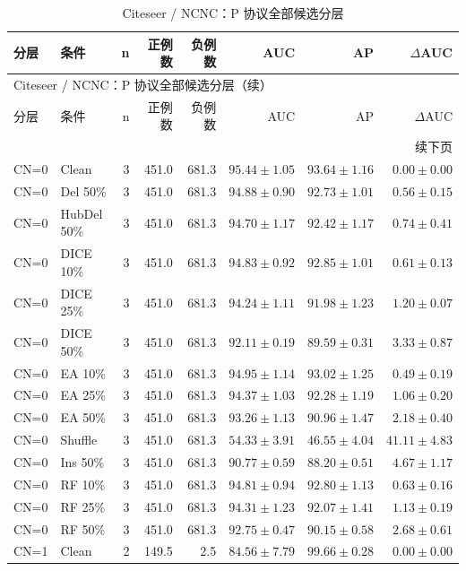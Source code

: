 {\footnotesize
\setlength{\tabcolsep}{3.2pt}
\renewcommand{\arraystretch}{1.10}
\begin{longtable}{llrrrrrr}
\caption{Citeseer / NCNC：P 协议全部候选分层}\\
\toprule
分层 & 条件 & n & 正例数 & 负例数 & AUC & AP & $\Delta$AUC \\
\midrule
\endfirsthead
\multicolumn{8}{l}{Citeseer / NCNC：P 协议全部候选分层（续）}\\
\toprule
分层 & 条件 & n & 正例数 & 负例数 & AUC & AP & $\Delta$AUC \\
\midrule
\endhead
\midrule\multicolumn{8}{r}{续下页}\\
\endfoot
\bottomrule
\endlastfoot
CN=0 & Clean & 3 & 451.0 & 681.3 & $95.44\pm1.05$ & $93.64\pm1.16$ & $0.00\pm0.00$ \\
CN=0 & Del 50\% & 3 & 451.0 & 681.3 & $94.88\pm0.90$ & $92.73\pm1.01$ & $0.56\pm0.15$ \\
CN=0 & HubDel 50\% & 3 & 451.0 & 681.3 & $94.70\pm1.17$ & $92.42\pm1.17$ & $0.74\pm0.41$ \\
CN=0 & DICE 10\% & 3 & 451.0 & 681.3 & $94.83\pm0.92$ & $92.85\pm1.01$ & $0.61\pm0.13$ \\
CN=0 & DICE 25\% & 3 & 451.0 & 681.3 & $94.24\pm1.11$ & $91.98\pm1.23$ & $1.20\pm0.07$ \\
CN=0 & DICE 50\% & 3 & 451.0 & 681.3 & $92.11\pm0.19$ & $89.59\pm0.31$ & $3.33\pm0.87$ \\
CN=0 & EA 10\% & 3 & 451.0 & 681.3 & $94.95\pm1.14$ & $93.02\pm1.25$ & $0.49\pm0.19$ \\
CN=0 & EA 25\% & 3 & 451.0 & 681.3 & $94.37\pm1.03$ & $92.28\pm1.19$ & $1.06\pm0.20$ \\
CN=0 & EA 50\% & 3 & 451.0 & 681.3 & $93.26\pm1.13$ & $90.96\pm1.47$ & $2.18\pm0.40$ \\
CN=0 & Shuffle & 3 & 451.0 & 681.3 & $54.33\pm3.91$ & $46.55\pm4.04$ & $41.11\pm4.83$ \\
CN=0 & Ins 50\% & 3 & 451.0 & 681.3 & $90.77\pm0.59$ & $88.20\pm0.51$ & $4.67\pm1.17$ \\
CN=0 & RF 10\% & 3 & 451.0 & 681.3 & $94.81\pm0.94$ & $92.80\pm1.13$ & $0.63\pm0.16$ \\
CN=0 & RF 25\% & 3 & 451.0 & 681.3 & $94.31\pm1.23$ & $92.07\pm1.41$ & $1.13\pm0.19$ \\
CN=0 & RF 50\% & 3 & 451.0 & 681.3 & $92.75\pm0.47$ & $90.15\pm0.58$ & $2.68\pm0.61$ \\
CN=1 & Clean & 2 & 149.5 & 2.5 & $84.56\pm7.79$ & $99.66\pm0.28$ & $0.00\pm0.00$ \\

\end{longtable}}
